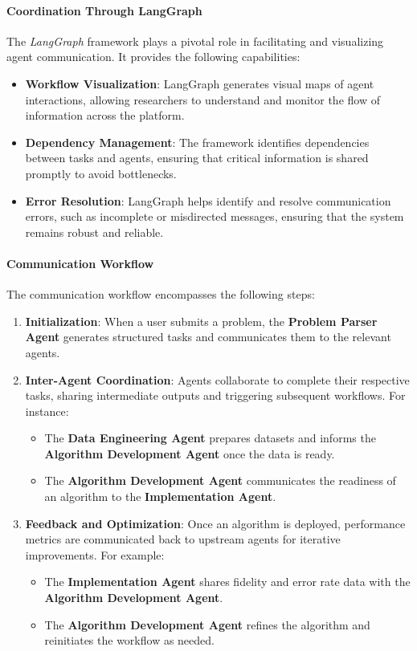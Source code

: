 \documentclass[12pt]{article}
\begin{document}
\paragraph{Coordination Through LangGraph}
The \textit{LangGraph} framework plays a pivotal role in facilitating and visualizing agent communication. It provides the following capabilities:
\begin{itemize}
    \item \textbf{Workflow Visualization}: LangGraph generates visual maps of agent interactions, allowing researchers to understand and monitor the flow of information across the platform.
    \item \textbf{Dependency Management}: The framework identifies dependencies between tasks and agents, ensuring that critical information is shared promptly to avoid bottlenecks.
    \item \textbf{Error Resolution}: LangGraph helps identify and resolve communication errors, such as incomplete or misdirected messages, ensuring that the system remains robust and reliable.
\end{itemize}

\paragraph{Communication Workflow}
The communication workflow encompasses the following steps:
\begin{enumerate}
    \item \textbf{Initialization}: When a user submits a problem, the \textbf{Problem Parser Agent} generates structured tasks and communicates them to the relevant agents.
    \item \textbf{Inter-Agent Coordination}: Agents collaborate to complete their respective tasks, sharing intermediate outputs and triggering subsequent workflows. For instance:
    \begin{itemize}
        \item The \textbf{Data Engineering Agent} prepares datasets and informs the \textbf{Algorithm Development Agent} once the data is ready.
        \item The \textbf{Algorithm Development Agent} communicates the readiness of an algorithm to the \textbf{Implementation Agent}.
    \end{itemize}
    \item \textbf{Feedback and Optimization}: Once an algorithm is deployed, performance metrics are communicated back to upstream agents for iterative improvements. For example:
    \begin{itemize}
        \item The \textbf{Implementation Agent} shares fidelity and error rate data with the \textbf{Algorithm Development Agent}.
        \item The \textbf{Algorithm Development Agent} refines the algorithm and reinitiates the workflow as needed.
    \end{itemize}
\end{enumerate}
\end{document}

